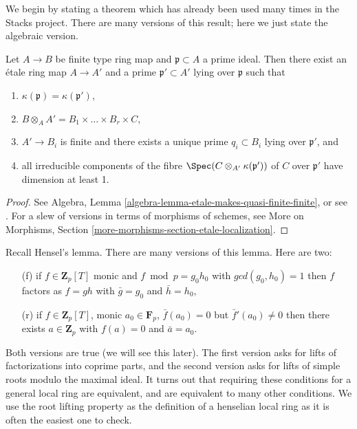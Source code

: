 \noindent
We begin by stating a theorem which has already been used many times
in the Stacks project. There are many versions of this result; here we
just state the algebraic version.

\begin{theorem}
\label{theorem-quasi-finite-etale-locally}
Let $A\to B$ be finite type ring map and $\mathfrak p \subset A$ a prime
ideal. Then there exist an \'etale ring map $A \to A'$ and a prime
$\mathfrak p' \subset A'$ lying over $\mathfrak p$ such that
\begin{enumerate}
\item
$\kappa(\mathfrak p) = \kappa(\mathfrak p')$,
\item
$ B \otimes_A A' = B_1\times \ldots \times B_r \times C$,
\item
$ A'\to B_i$ is finite and there exists a unique prime $q_i\subset B_i$ lying
over $\mathfrak p'$, and
\item all irreducible components of the fibre
$\Spec(C \otimes_{A'} \kappa(\mathfrak p'))$ of $C$ over $\mathfrak p'$
have dimension at least 1.
\end{enumerate}
\end{theorem}

\begin{proof}
See Algebra, Lemma \ref{algebra-lemma-etale-makes-quasi-finite-finite}, or
see \cite[Th\'eor\`eme 18.12.1]{EGA4}. For a slew of versions in terms of
morphisms of schemes, see
More on Morphisms, Section \ref{more-morphisms-section-etale-localization}.
\end{proof}

\noindent
Recall Hensel's lemma.
There are many versions of this lemma. Here are two:
\begin{enumerate}
\item[(f)] if $f\in \mathbf{Z}_p[T]$ monic and
$f \bmod p = g_0 h_0$ with $gcd(g_0, h_0) = 1$ then $f$ factors
as $f = gh$ with $\bar g = g_0$ and $\bar h = h_0$,
\item[(r)] if $f \in \mathbf{Z}_p[T]$, monic $a_0 \in \mathbf{F}_p$,
$\bar f(a_0) =0$ but $\bar f'(a_0) \neq 0$
then there exists $a \in \mathbf{Z}_p$ with
$f(a) = 0$ and $\bar a = a_0$.
\end{enumerate}
Both versions are true (we will see this later). The first version
asks for lifts of factorizations into coprime parts,
and the second version asks for lifts of simple roots
modulo the maximal ideal. It turns out that requiring
these conditions for a general local ring are equivalent, and are
equivalent to many other conditions. We use the root lifting
property as the definition of a henselian local ring as it is
often the easiest one to check.

